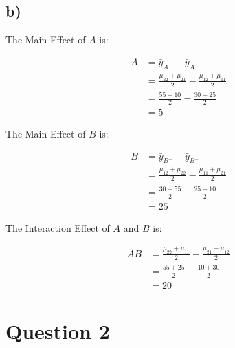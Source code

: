 \documentclass{article}
\begin{document}
\subsection*{b)}
\begin{flushleft}
The Main Effect of $A$ is:
\end{flushleft}
\begin{align*}
    A & = \bar{y}_{A^{+}} - \bar{y}_{A^{-}} \\
      & = \frac{\mu_{22} + \mu_{21}}{2} - \frac{\mu_{12} + \mu_{11}}{2} \\
      & = \frac{55 + 10}{2} - \frac{30 + 25}{2} \\
      & = 5
\end{align*}
\begin{flushleft}
The Main Effect of $B$ is:
\end{flushleft}
\begin{align*}
    B & = \bar{y}_{B^{+}} - \bar{y}_{B^{-}} \\
      & = \frac{\mu_{12} + \mu_{22}}{2} - \frac{\mu_{11} + \mu_{21}}{2} \\
      & = \frac{30 + 55}{2} - \frac{25 + 10}{2} \\
      & = 25
\end{align*}
\clearpage
\begin{flushleft}
The Interaction Effect of $A$ and $B$ is:
\end{flushleft}
\begin{align*}
    AB & = \frac{\mu_{22} + \mu_{11}}{2} - \frac{\mu_{21} + \mu_{12}}{2} \\
       & = \frac{55 + 25}{2} - \frac{10 + 30}{2} \\
       & = 20
\end{align*}

\section*{Question 2}
\end{document}
